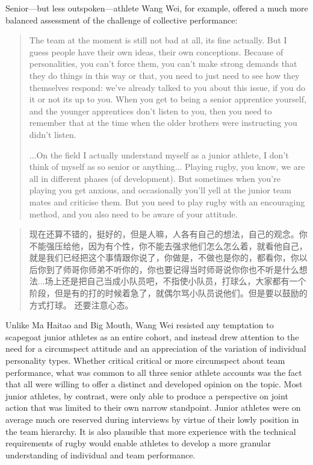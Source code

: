 \begin{CJK}{UTF8}{gbsn}
Senior---but less outspoken---athlete Wang Wei, for example, offered a much more balanced assessment of the challenge of collective performance:

\begin{quote}
   The team at the moment is still not bad at all, its fine actually.  But I guess people have their own ideas, their own conceptions.  Because of personalities, you can't force them, you can't make strong demands that they do things in this way or that, you need to just need to see how they themselves respond: we've already talked to you about this issue, if you do it or not its up to you.   When you get to being a senior apprentice yourself, and the younger apprentices don't listen to you, then you need to remember that at the time when the older brothers were instructing you didn't listen.

   ...On the field I actually understand myself as a junior athlete,  I don't think of myself as so senior or anything... Playing rugby, you know,  we are all in different phases (of development).  But sometimes when you're playing you get anxious, and occasionally you'll yell at the junior team mates and criticise them.  But you need to play rugby with an encouraging method, and you also need to be aware of your attitude.
\end{quote}

\begin{quote}
  	现在还算不错的，挺好的，但是人嘛，人各有自己的想法，自己的观念。你不能强压给他，因为有个性，你不能去强求他们怎么怎么着，就看他自己，就是我们已经把这个事情跟你说了，你做是，不做也是你的，都看你，你以后你到了师哥你师弟不听你的，你也要记得当时师哥说你你也不听是什么想法...场上还是把自己当成小队员吧，不指使小队员，打球么，大家都有一个阶段，但是有的打的时候着急了，就偶尔骂小队员说他们。但是要以鼓励的方式打球。 还要注意心态。
\end{quote}

Unlike Ma Haitao and Big Mouth, Wang Wei resisted any temptation to scapegoat junior athletes as an entire cohort, and instead drew attention to the need for a circumspect attitude and an appreciation of the variation of individual personality types.  Whether critical critical or more circumspect about team performance,
what was common to all three senior athlete accounts was the fact that all were willing to offer a distinct and developed opinion on the topic. Most junior athletes, by contrast, were only able to produce a perspective on joint action that was limited to their own narrow standpoint.  Junior athletes were on average much ore reserved during interviews by virtue of their lowly position in the team hierarchy.  It is also plausible that more experience with the technical requirements of rugby would enable athletes to develop a more granular understanding of individual and team performance.



\end{CJK}
